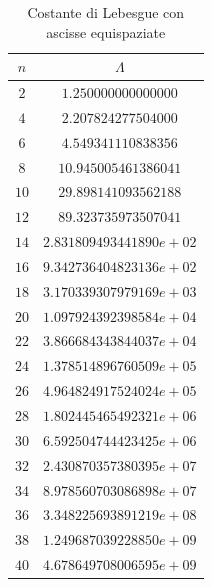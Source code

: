 \begin{table}
	\begin{center}
		\caption{Costante di Lebesgue con ascisse equispaziate}
		\begin{tabular}{|c|c|}
			\hline
			$n$ & $\Lambda$ \\
			\hline
			$2$  & $1.250000000000000$ \\ 
			$4$  & $2.207824277504000$ \\ 
			$6$  & $4.549341110838356$ \\ 
			$8$  & $10.945005461386041$ \\ 
			$10$ & $29.898141093562188$ \\ 
			$12$ & $89.323735973507041$ \\ 
			$14$ & $2.831809493441890e+02$ \\ 
			$16$ & $9.342736404823136e+02$ \\ 
			$18$ & $3.170339307979169e+03$ \\ 
			$20$ & $1.097924392398584e+04$ \\ 
			$22$ & $3.866684343844037e+04$ \\ 
			$24$ & $1.378514896760509e+05$ \\ 
			$26$ & $4.964824917524024e+05$ \\ 
			$28$ & $1.802445465492321e+06$ \\ 
			$30$ & $6.592504744423425e+06$ \\ 
			$32$ & $2.430870357380395e+07$ \\ 
			$34$ & $8.978560703086898e+07$ \\ 
			$36$ & $3.348225693891219e+08$ \\ 
			$38$ & $1.249687039228850e+09$ \\ 
			$40$ & $4.678649708006595e+09$ \\ 
			\hline
		\end{tabular}
	\end{center}
\end{table}
